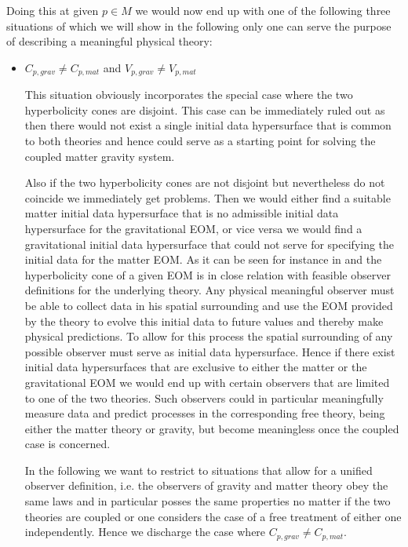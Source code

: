 \documentclass[a4paper,12pt, DIV=14, BCOR=5mm, twoside, headsepline, numbers=noenddot]{scrbook}
\begin{document}
Doing this at given $p \in M$ we would now end up with one of the following three situations of which we will show in the following only one can serve the purpose of describing a meaningful physical theory:
\begin{itemize}
    \item $C_{p,grav} \neq C_{p,mat}$ and $V_{p,grav} \neq V_{p,mat}$
    
This situation obviously incorporates the special case where the two hyperbolicity cones are disjoint. This case can be immediately ruled out as then there would not exist a single initial data hypersurface that is common to both theories and hence could serve as a starting point for solving the coupled matter gravity system.   

Also if the two hyperbolicity cones are not disjoint but nevertheless do not coincide we immediately get problems. Then we would either find a suitable matter initial data hypersurface that is no admissible initial data hypersurface for the gravitational EOM, or vice versa we would find a gravitational initial data hypersurface that could not serve for specifying the initial data for the matter EOM. As it can be seen for instance in \cite{Rivera} and \cite{2011PhRvD..83d4047R} the hyperbolicity cone of a given EOM is in close relation with feasible observer definitions for the underlying theory. Any physical meaningful observer must be able to collect data in his spatial surrounding and use the EOM provided by the theory to evolve this initial data to future values and thereby make physical predictions. To allow for this process the spatial surrounding of any possible observer must serve as initial data hypersurface. Hence if there exist initial data hypersurfaces that are exclusive to either the matter or the gravitational EOM we would end up with certain observers that are limited to one of the two theories. Such observers could in particular meaningfully measure data and predict processes in the corresponding free theory, being either the matter theory or gravity, but become meaningless once the coupled case is concerned.

In the following we want to restrict to situations that allow for a unified observer definition, i.e. the observers of gravity and matter theory obey the same laws and in particular posses the same properties no matter if the two theories are coupled or one considers the case of a free treatment of either one independently. Hence we discharge the case where $C_{p,grav} \neq C_{p,mat}$.


\end{itemize}
\end{document}
